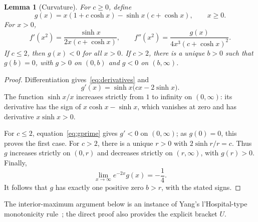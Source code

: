 \documentclass[11pt]{article}
\newtheorem{lemma}{Lemma}
\begin{document}
\begin{lemma}[Curvature]\label{lem:curvature}
For $c\geq0$, define
\[
 g(x)=x(1+c\cosh x)-\sinh x(c+\cosh x),\qquad x\geq0.
\]
For $x>0$,
\begin{equation}\label{eq:derivatives}
 f'(x^2)=\frac{\sinh x}{2x(c+\cosh x)},\qquad
 f''(x^2)=\frac{g(x)}{4x^3(c+\cosh x)^2}.
\end{equation}
If $c\leq2$, then $g(x)<0$ for all $x>0$. If $c>2$, there is a unique
$b>0$ such that $g(b)=0$, with $g>0$ on $(0,b)$ and $g<0$ on $(b,\infty)$.
\end{lemma}
\begin{proof}
Differentiation gives~\eqref{eq:derivatives} and
\begin{equation}\label{eq:gprime}
 g'(x)=\sinh x\bigl(cx-2\sinh x\bigr).
\end{equation}
The function $\sinh x/x$ increases strictly from $1$ to infinity on
$(0,\infty)$: its derivative has the sign of $x\cosh x-\sinh x$, which
vanishes at zero and has derivative $x\sinh x>0$.

For $c\leq2$, equation~\eqref{eq:gprime} gives $g'<0$ on $(0,\infty)$;
as $g(0)=0$, this proves the first case. For $c>2$, there is a unique
$r>0$ with $2\sinh r/r=c$. Thus $g$ increases strictly on $(0,r)$ and
decreases strictly on $(r,\infty)$, with $g(r)>0$. Finally,
\[
 \lim_{x\to\infty}e^{-2x}g(x)=-\frac14.
\]
It follows that $g$ has exactly one positive zero $b>r$, with the stated
signs.
\end{proof}

The interior-maximum argument below is an instance of Yang's
l'Hospital-type monotonicity rule~\cite[Theorem~8]{Yang}; the direct proof
also provides the explicit bracket $U$.
\end{document}
